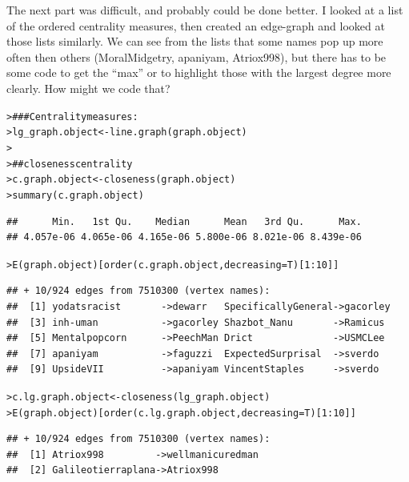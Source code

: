 \documentclass[12pt]{article}\usepackage[]{graphicx}\usepackage[]{color}
\makeatletter
\newcommand{\hlnum}[1]{\textcolor[rgb]{0.82,0.78,0.62}{#1}}%
\newcommand{\hlcom}[1]{\textcolor[rgb]{0.404,0.408,0.42}{#1}}%
\newcommand{\hlopt}[1]{\textcolor[rgb]{0.882,0.878,0.898}{#1}}%
\newcommand{\hlstd}[1]{\textcolor[rgb]{0.882,0.878,0.898}{#1}}%
\newcommand{\hlkwb}[1]{\textcolor[rgb]{0.902,0.675,0.196}{#1}}%
\newcommand{\hlkwc}[1]{\textcolor[rgb]{0.812,0.522,0.388}{#1}}%
\newcommand{\hlkwd}[1]{\textcolor[rgb]{0.733,0.388,0.812}{#1}}%
\newenvironment{kframe}{%
 \def\at@end@of@kframe{}%
 \ifinner\ifhmode%
  \def\at@end@of@kframe{\end{minipage}}%
  \begin{minipage}{\columnwidth}%
 \fi\fi%
 \def\FrameCommand##1{\hskip\@totalleftmargin \hskip-\fboxsep
 \colorbox{shadecolor}{##1}\hskip-\fboxsep
     \hskip-\linewidth \hskip-\@totalleftmargin \hskip\columnwidth}%
 \MakeFramed {\advance\hsize-\width
   \@totalleftmargin\z@ \linewidth\hsize
   \@setminipage}}%
 {\par\unskip\endMakeFramed%
 \at@end@of@kframe}
\newenvironment{knitrout}{}{} %
\makeatother
\begin{document}
\begin{flushleft}
The next part was difficult, and probably could be done better. I looked at a list of the ordered centrality measures, then created an edge-graph and looked at those lists similarly. We can see from the lists that some names pop up more often then others (MoralMidgetry, apaniyam, Atriox998), but there has to be some code to get the ``max'' or to highlight those with the largest degree more clearly. How might we code that? 

\begin{knitrout}
\color{fgcolor}\begin{kframe}
\begin{alltt}
\hlstd{> }\hlcom{### Centrality measures:}
\hlstd{> }\hlstd{lg_graph.object} \hlkwb{<-} \hlkwd{line.graph}\hlstd{(graph.object)}
\hlstd{> }
\hlstd{> }\hlcom{## closeness centrality}
\hlstd{> }\hlstd{c.graph.object} \hlkwb{<-} \hlkwd{closeness}\hlstd{(graph.object)}
\hlstd{> }\hlkwd{summary}\hlstd{(c.graph.object)}
\end{alltt}
\begin{verbatim}
##      Min.   1st Qu.    Median      Mean   3rd Qu.      Max. 
## 4.057e-06 4.065e-06 4.165e-06 5.800e-06 8.021e-06 8.439e-06
\end{verbatim}
\begin{alltt}
\hlstd{> }\hlkwd{E}\hlstd{(graph.object)[}\hlkwd{order}\hlstd{(c.graph.object,} \hlkwc{decreasing}\hlstd{=T)[}\hlnum{1}\hlopt{:}\hlnum{10}\hlstd{]]}
\end{alltt}
\begin{verbatim}
## + 10/924 edges from 7510300 (vertex names):
##  [1] yodatsracist       ->dewarr   SpecificallyGeneral->gacorley
##  [3] inh-uman           ->gacorley Shazbot_Nanu       ->Ramicus 
##  [5] Mentalpopcorn      ->PeechMan Drict              ->USMCLee 
##  [7] apaniyam           ->faguzzi  ExpectedSurprisal  ->sverdo  
##  [9] UpsideVII          ->apaniyam VincentStaples     ->sverdo
\end{verbatim}
\begin{alltt}
\hlstd{> }\hlstd{c.lg.graph.object} \hlkwb{<-} \hlkwd{closeness}\hlstd{(lg_graph.object)}
\hlstd{> }\hlkwd{E}\hlstd{(graph.object)[}\hlkwd{order}\hlstd{(c.lg.graph.object,} \hlkwc{decreasing}\hlstd{=T)[}\hlnum{1}\hlopt{:}\hlnum{10}\hlstd{]]}
\end{alltt}
\begin{verbatim}
## + 10/924 edges from 7510300 (vertex names):
##  [1] Atriox998         ->wellmanicuredman  
##  [2] Galileotierraplana->Atriox998         

\end{verbatim}
\end{kframe}
\end{knitrout}
\end{flushleft}
\end{document}
